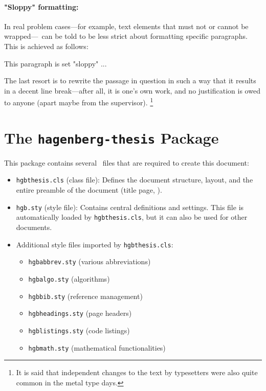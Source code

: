 \paragraph{"Sloppy" formatting:} In real problem cases---for example, text
elements that must not or cannot be wrapped---\latex\ can be told to be less
strict about formatting specific paragraphs. This is achieved as follows:
%
\begin{LaTeXCode}[numbers=none]
\begin{sloppypar}
    This paragraph is set "sloppy" ...
\end{sloppypar}
\end{LaTeXCode}
%
The last resort is to rewrite the passage in question in such a way that it
results in a decent line break---after all, it is one's own work, and no
justification is owed to anyone (apart maybe from the supervisor).%
\footnote{It is said that independent changes to the text by typesetters were
also quite common in the metal type days.}


\section{The \texttt{hagenberg-thesis} Package}

This package contains several \latex\ files that are required to create this
document:
%
\begin{itemize}
    \item \nolinkurl{hgbthesis.cls} (class file): Defines the document
    structure, layout, and the entire preamble of the document (title page,
    \etc).
    \item \nolinkurl{hgb.sty} (style file): Contains central definitions and
    settings. This file is automatically loaded by \nolinkurl{hgbthesis.cls},
    but it can also be used for other documents.
    \item Additional style files imported by \nolinkurl{hgbthesis.cls}:
    \begin{itemize}
        \item[] \nolinkurl{hgbabbrev.sty} (various abbreviations)
        \item[] \nolinkurl{hgbalgo.sty} (algorithms)
        \item[] \nolinkurl{hgbbib.sty} (reference management)
        \item[] \nolinkurl{hgbheadings.sty} (page headers)
        \item[] \nolinkurl{hgblistings.sty} (code listings)
        \item[] \nolinkurl{hgbmath.sty} (mathematical functionalities)
    \end{itemize}
\end{itemize}


